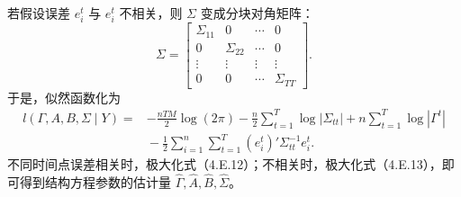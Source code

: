 若假设误差 $e_i^t$ 与 $e_i^t$ 不相关，则 $\Sigma$ 变成分块对角矩阵：
\[
\Sigma=\begin{bmatrix}
\Sigma_{11}&0&\cdots&0\\0&\Sigma_{22}&\cdots&0\\
\vdots&\vdots&\vdots&\vdots\\0&0&\cdots&\Sigma_{TT}
\end{bmatrix}.
\]
于是，似然函数化为
\begin{equation}
\begin{aligned}
l(\Gamma,A,B,\Sigma\mid Y)
={}&-\frac{nTM}{2}\log(2\pi)-\frac n2\sum_{t=1}^{T}\log|\Sigma_{tt}|
+n\sum_{t=1}^{T}\log|\Gamma^t|\\
&{}-\frac12\sum_{i=1}^{n}\sum_{t=1}^{T}(e_i^t)'\Sigma_{tt}^{-1}e_i^t.
\end{aligned}\tag{4.E.13}
\end{equation}
不同时间点误差相关时，极大化式（4.E.12）；不相关时，极大化式（4.E.13），即可得到结构方程参数的估计量 $\widehat\Gamma,\widehat A,\widehat B,\widehat\Sigma$。
